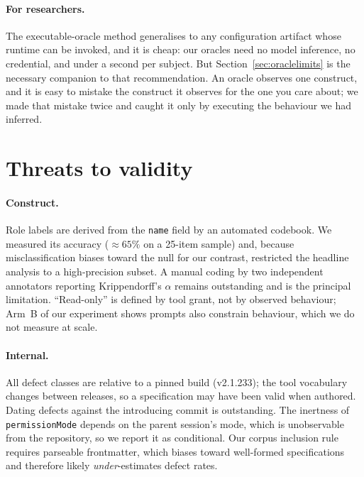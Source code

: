 \documentclass[smallextended,natbib]{svjour3}
\newcommand{\code}[1]{\texttt{\small #1}}
\begin{document}
\paragraph{For researchers.} The executable-oracle method generalises to any configuration artifact
whose runtime can be invoked, and it is cheap: our oracles need no model inference, no credential,
and under a second per subject. But Section~\ref{sec:oraclelimits} is the necessary companion to that
recommendation. An oracle observes one construct, and it is easy to mistake the construct it observes
for the one you care about; we made that mistake twice and caught it only by executing the behaviour
we had inferred.

\section{Threats to validity}
\label{sec:threats}

\paragraph{Construct.} Role labels are derived from the \code{name} field by an automated codebook.
We measured its accuracy ($\approx\!65\%$ on a 25-item sample) and, because misclassification biases
toward the null for our contrast, restricted the headline analysis to a high-precision subset. A
manual coding by two independent annotators reporting Krippendorff's $\alpha$
\citep{krippendorff2004reliability} remains outstanding and is the principal limitation. ``Read-only''
is defined by tool grant, not by observed behaviour; Arm~B of our experiment shows prompts also
constrain behaviour, which we do not measure at scale.

\paragraph{Internal.} All defect classes are relative to a pinned build (v2.1.233); the tool
vocabulary changes between releases, so a specification may have been valid when authored. Dating
defects against the introducing commit is outstanding. The inertness of \code{permissionMode} depends
on the parent session's mode, which is unobservable from the repository, so we report it as
conditional. Our corpus inclusion rule requires parseable frontmatter, which biases toward well-formed
specifications and therefore likely \emph{under}-estimates defect rates.
\end{document}
